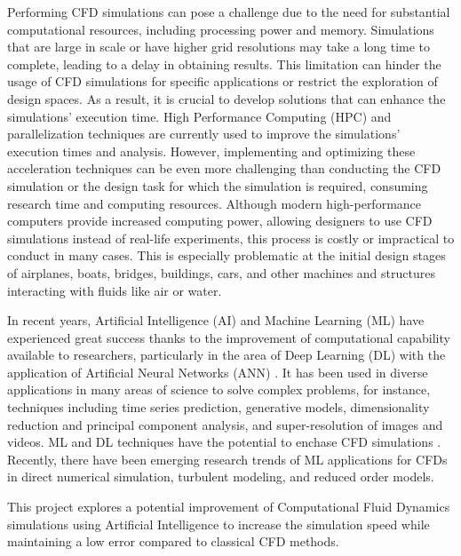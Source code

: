 Performing CFD simulations can pose a challenge due to the need for substantial computational resources, including processing power and memory. Simulations that are large in scale or have higher grid resolutions may take a long time to complete, leading to a delay in obtaining results. This limitation can hinder the usage of CFD simulations for specific applications or restrict the exploration of design spaces. As a result, it is crucial to develop solutions that can enhance the simulations' execution time. High Performance Computing (HPC) and parallelization techniques are currently used to improve the simulations' execution times and analysis. However, implementing and optimizing these acceleration techniques can be even more challenging than conducting the CFD simulation or the design task for which the simulation is required, consuming research time and computing resources. Although modern high-performance computers provide increased computing power, allowing designers to use CFD simulations instead of real-life experiments, this process is costly or impractical to conduct in many cases. This is especially problematic at the initial design stages of airplanes, boats, bridges, buildings, cars, and other machines and structures interacting with fluids like air or water. 

In recent years, Artificial Intelligence (AI) and Machine Learning (ML) have experienced great success thanks to the improvement of computational capability available to researchers, particularly in the area of Deep Learning (DL) with the application of Artificial Neural Networks (ANN) \cite{lecun_deep_2015}.  It has been used in diverse applications in many areas of science to solve complex problems, for instance, techniques including time series prediction, generative models, dimensionality reduction and principal component analysis, and super-resolution of images and videos. ML and DL techniques have the potential to enchase CFD simulations \cite{vinuesa_enhancing_2022}. Recently, there have been emerging research trends of ML applications for CFDs \cite{vinuesa_emerging_2022} in direct numerical simulation, turbulent modeling, and reduced order models.

This project explores a potential improvement of Computational Fluid Dynamics simulations using Artificial Intelligence to increase the simulation speed while maintaining a low error compared to classical CFD methods.


